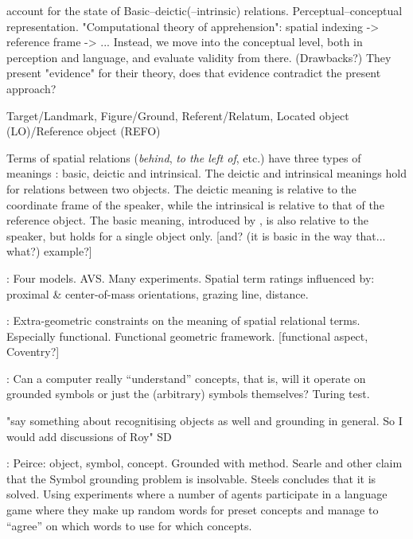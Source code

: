 \cite{LoganComputationalAnalysisApprehension1996} account for the state of 
Basic–deictic(–intrinsic) relations.
Perceptual–conceptual representation.
"Computational theory of apprehension": spatial indexing -> reference frame -> ... Instead, we move into the conceptual level, both in perception and language, and evaluate validity from there.
(Drawbacks?)
They present "evidence" for their theory, does that evidence contradict the present approach?

Target/Landmark, Figure/Ground, Referent/Relatum, Located object (LO)/Reference object (REFO)

Terms of spatial relations (\textit{behind}, \textit{to the left of}, etc.) have three types of meanings \citep{Garnhamunifiedtheorymeaning1989}: basic, deictic and intrinsical.
The deictic and intrinsical meanings hold for relations between two objects.
The deictic meaning is relative to the coordinate frame of the speaker, while the intrinsical is relative to that of the reference object.
The basic meaning, introduced by \cite{Garnhamunifiedtheorymeaning1989}, is also relative to the speaker, but holds for a single object only.
[and? (it is basic in the way that... what?) example?]

\cite{RegierGroundingspatiallanguage2001a}:
Four models. AVS.
Many experiments.
Spatial term ratings influenced by: proximal \& center-of-mass orientations, grazing line, distance.

\cite{CoventryClassificationExtrageometricInfluences2004}:
Extra-geometric constraints on the meaning of spatial relational terms.
Especially functional.
Functional geometric framework.
[functional aspect, Coventry?]

\cite{HarnadSymbolGroundingProblem1990}:
Can a computer really ``understand'' concepts, that is, will it operate on grounded symbols or just the (arbitrary) symbols themselves?
Turing test.

"say something about recognitising objects as well and grounding in general. So I would add discussions of Roy" SD



\cite{SteelsSymbolGroundingProblem2007}:
Peirce: object, symbol, concept. Grounded with method.
Searle and other claim that the Symbol grounding problem is insolvable.
Steels concludes that it is solved.
Using experiments where a number of agents participate in a language game where they make up random words for preset concepts and manage to ``agree'' on which words to use for which concepts.

